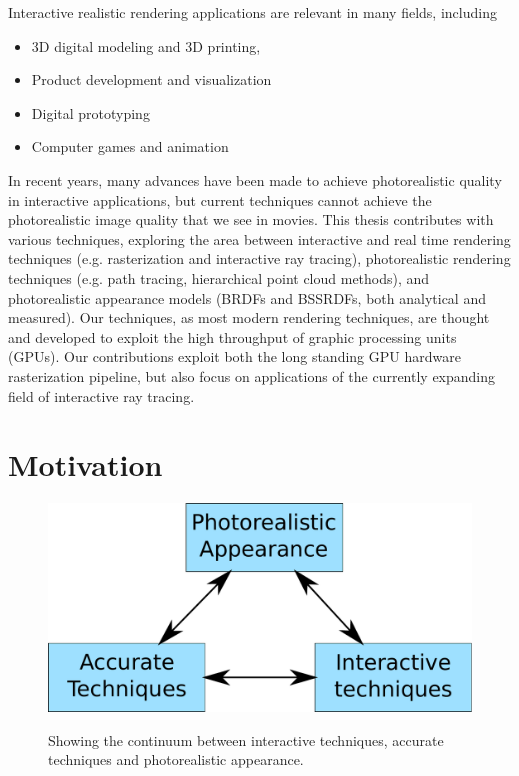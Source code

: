 Interactive realistic rendering applications are relevant in many fields, including
\begin{itemize}
\item 3D digital modeling and 3D printing,
\item Product development and visualization
\item Digital prototyping
\item Computer games and animation
\end{itemize}
In recent years, many advances have been made to achieve photorealistic quality in interactive applications,  but current techniques cannot achieve the photorealistic image quality that we see in movies. This thesis contributes with various techniques, exploring the area between interactive and real time rendering techniques (e.g. rasterization and interactive ray tracing), photorealistic rendering techniques (e.g. path tracing, hierarchical point cloud methods), and photorealistic appearance models (BRDFs and BSSRDFs, both analytical and measured). Our techniques, as most modern rendering techniques, are thought and developed to exploit the high throughput of graphic processing units (GPUs). Our contributions exploit both the long standing GPU hardware rasterization pipeline, but also focus on applications of the currently expanding field of interactive ray tracing. 

\section{Motivation}

\begin{figure}
\centering
	 \includegraphics[width=\textwidth]{figures/main_diagram}  \\
\caption{Showing the continuum between interactive techniques, accurate techniques and photorealistic appearance.} 
\label{fig:main_diagram}
\end{figure}

